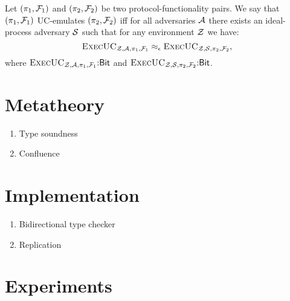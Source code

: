 \documentclass[acmsmall,review,anonymous]{acmart}\settopmatter{printfolios=true,printccs=false,printacmref=false}
\begin{document}
\begin{definition}
Let $(\pi_1, \mathcal{F}_1)$ and $(\pi_2, \mathcal{F}_2)$ be two protocol-functionality
pairs. We say that $(\pi_1, \mathcal{F}_1)$ UC-emulates $(\pi_2, \mathcal{F}_2)$ iff for all
adversaries $\mathcal{A}$ there exists an ideal-process adversary $\mathcal{S}$ such that
for any environment $\mathcal{Z}$ we have:
\[\textsc{ExecUC}_{\mathcal{Z}, \mathcal{A}, \pi_1, \mathcal{F}_1} \approx_{\epsilon} \textsc{ExecUC}_{\mathcal{Z}, \mathcal{S}, \pi_2, \mathcal{F}_2},\]
\noindent where $\textsc{ExecUC}_{\mathcal{Z}, \mathcal{A}, \pi_1, \mathcal{F}_1}{:}{\sf Bit}$ and
$\textsc{ExecUC}_{\mathcal{Z}, \mathcal{S}, \pi_2, \mathcal{F}_2}{:}{\sf Bit}$.
\end{definition}

%


\section{Metatheory}\label{sec:metatheory}

\begin{enumerate}
\item Type soundness
\item Confluence
\end{enumerate}

\section{Implementation}\label{sec:implementation}

\begin{enumerate}
\item Bidirectional type checker
\item Replication
\end{enumerate}

\section{Experiments}\label{sec:experiments}
\end{document}
